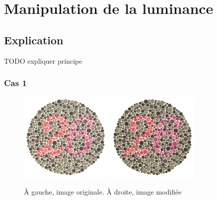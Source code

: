\documentclass[a4paper]{article}
\begin{document}
\clearpage

\section{Manipulation de la luminance}

\subsection{Explication}

TODO expliquer principe

\subsubsection{Cas 1}

\begin{figure}[H]
\begin{center}
\includegraphics[width=170px]{../base/cas_1_dalton26.png}
\includegraphics[width=170px]{../base/cas_1_luminance.png}
\end{center}
\caption{À gauche, image originale. À droite, image modifiée}
\end{figure}
\end{document}
